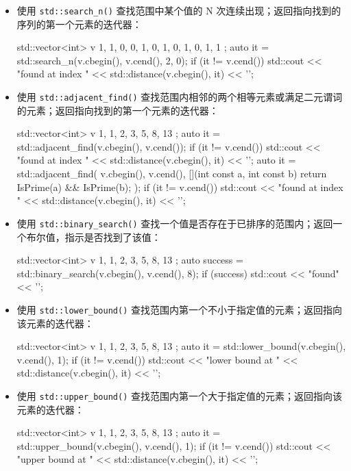 \begin{itemize}
\item
使用 \verb|std::search_n()| 查找范围中某个值的 N 次连续出现；返回指向找到的序列的第一个元素的迭代器：

\begin{cpp}
std::vector<int> v{ 1, 1, 0, 0, 1, 0, 1, 0, 1, 0, 1, 1 };
auto it = std::search_n(v.cbegin(), v.cend(), 2, 0);
if (it != v.cend())
    std::cout << "found at index "
              << std::distance(v.cbegin(), it) << '\n';
\end{cpp}

\item
使用 \verb|std::adjacent_find()| 查找范围内相邻的两个相等元素或满足二元谓词的元素；返回指向找到的第一个元素的迭代器：

\begin{cpp}
std::vector<int> v{ 1, 1, 2, 3, 5, 8, 13 };
auto it = std::adjacent_find(v.cbegin(), v.cend());
if (it != v.cend())
    std::cout << "found at index "
              << std::distance(v.cbegin(), it) << '\n';
auto it = std::adjacent_find(
    v.cbegin(), v.cend(),
    [](int const a, int const b) {
        return IsPrime(a) && IsPrime(b); });
if (it != v.cend())
    std::cout << "found at index "
              << std::distance(v.cbegin(), it) << '\n';
\end{cpp}

\item
使用 \verb|std::binary_search()| 查找一个值是否存在于已排序的范围内；返回一个布尔值，指示是否找到了该值：

\begin{cpp}
std::vector<int> v{ 1, 1, 2, 3, 5, 8, 13 };
auto success = std::binary_search(v.cbegin(), v.cend(), 8);
if (success) std::cout << "found" << '\n';
\end{cpp}

\item
使用 \verb|std::lower_bound()| 查找范围内第一个不小于指定值的元素；返回指向该元素的迭代器：

\begin{cpp}
std::vector<int> v{ 1, 1, 2, 3, 5, 8, 13 };
auto it = std::lower_bound(v.cbegin(), v.cend(), 1);
if (it != v.cend())
    std::cout << "lower bound at "
              << std::distance(v.cbegin(), it) << '\n';
\end{cpp}

\item
使用 \verb|std::upper_bound()| 查找范围内第一个大于指定值的元素；返回指向该元素的迭代器：

\begin{cpp}
std::vector<int> v{ 1, 1, 2, 3, 5, 8, 13 };
auto it = std::upper_bound(v.cbegin(), v.cend(), 1);
if (it != v.cend())
    std::cout << "upper bound at "
              << std::distance(v.cbegin(), it) << '\n';
\end{cpp}


\end{itemize}
